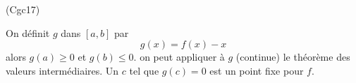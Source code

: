 \begin{tiny}(Cgc17)\end{tiny} On définit $g$ dans $[a,b]$ par
\begin{displaymath}
  g(x) = f(x) -x
\end{displaymath}
alors $g(a)\geq 0$ et $g(b)\leq 0$. on peut appliquer à $g$ (continue) le théorème des valeurs intermédiaires. Un $c$ tel que $g(c)=0$ est un point fixe pour $f$.